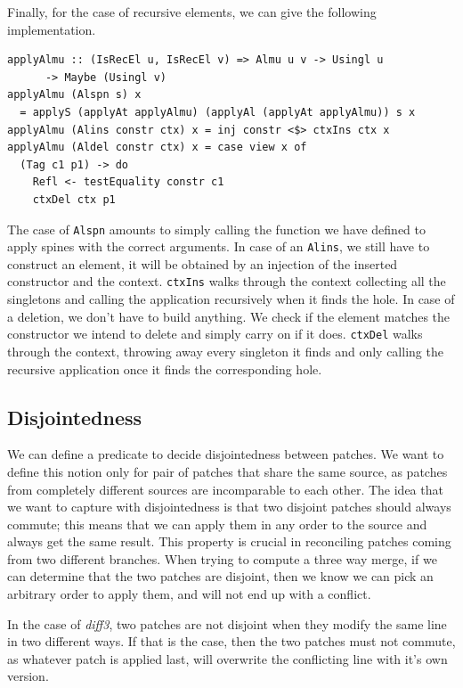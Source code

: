 \documentclass[11pt, titlepage]{article}
\newcommand{\toHaskell}[1]{\texttt{#1}\xspace}
\newcommand{\diffthree}{\emph{diff3}\xspace}
\newcommand{\alins}{\toHaskell{Alins}}
\newcommand{\alspn}{\toHaskell{Alspn}}
\begin{document}
Finally, for the case of recursive elements, we can give the following 
implementation.

\begin{verbatim}
applyAlmu :: (IsRecEl u, IsRecEl v) => Almu u v -> Usingl u 
	  -> Maybe (Usingl v)
applyAlmu (Alspn s) x 
  = applyS (applyAt applyAlmu) (applyAl (applyAt applyAlmu)) s x
applyAlmu (Alins constr ctx) x = inj constr <$> ctxIns ctx x
applyAlmu (Aldel constr ctx) x = case view x of
  (Tag c1 p1) -> do
    Refl <- testEquality constr c1
    ctxDel ctx p1
\end{verbatim}

The case of \alspn amounts to simply calling the function we have defined to 
apply spines with the correct arguments.
In case of an \alins, we still have to construct an element, it will be obtained
by an injection of the inserted constructor and the context. 
\texttt{ctxIns} walks through the context collecting all the singletons and 
calling the application recursively when it finds the hole.
In case of a deletion, we don't have to build anything. We check if the element 
matches the constructor we intend to delete and simply carry on if it does.
\texttt{ctxDel} walks through the context, throwing away every singleton it 
finds and only calling the recursive application once it finds the corresponding 
hole.

\subsection{Disjointedness}\label{disj}
We can define a predicate to decide disjointedness between patches. We want to define this notion only for pair of patches that share the same source, as patches from completely different sources are incomparable to each other. 
The idea that we want to capture with disjointedness is that two disjoint patches should always commute; this means that we can apply them in any order to the source and always get the same result.
This property is crucial in reconciling patches coming from two different branches. When trying to compute a three way merge, if we can determine that the two patches are disjoint, then we know we can pick an arbitrary order to apply them, and will not end up with a conflict.

In the case of \diffthree, two patches are not disjoint when they modify the same line in two different ways. If that is the case, then the two patches must not commute, as whatever patch is applied last, will overwrite the conflicting line with it's own version.
\end{document}
